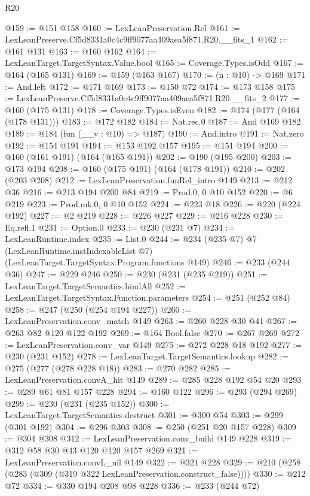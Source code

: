 \begin{lexlean}{R20}
\begin{coremodule}
@159 := @151 @158
@160 := LexLeanPreservation.Rel
@161 := LexLeanPreserve.Cf5d8331a0c4c9ff9077aa409aea5f871.R20.__fits_1
@162 := @161 @131
@163 := @160 @162
@164 := LexLeanTarget.TargetSyntax.Value.bool
@165 := Coverage.Types.isOdd
@167 := @164 (@165 @131)
@169 := @159 (@163 @167)
@170 := (n : @10) -> @169
@171 := And.left
@172 := @171 @169
@173 := @150 @72
@174 := @173 @158
@175 := LexLeanPreserve.Cf5d8331a0c4c9ff9077aa409aea5f871.R20.__fits_2
@177 := @160 (@175 @131)
@178 := Coverage.Types.isEven
@182 := @174 (@177 (@164 (@178 @131)))
@183 := @172 @182
@184 := Nat.rec.{0}
@187 := And @169 @182
@189 := @184 (fun (__v : @10) => @187)
@190 := And.intro
@191 := Nat.zero
@192 := @154 @191
@194 := @153 @192 @157
@195 := @151 @194
@200 := @160 (@161 @191) (@164 (@165 @191))
@202 := @190 (@195 @200)
@203 := @173 @194
@208 := @160 (@175 @191) (@164 (@178 @191))
@210 := @202 (@203 @208)
@212 := LexLeanPreservation.funRel_intro @149
@213 := @212 @36
@216 := @213 @194 @200 @84
@219 := Prod.{0, 0} @10 @152
@220 := @6 @219
@223 := Prod.mk.{0, 0} @10 @152
@224 := @223 @18
@226 := @220 (@224 @192)
@227 := @2 @219
@228 := @226 @227
@229 := @216 @228
@230 := Eq.refl.{1}
@231 := Option.{0}
@233 := @230 (@231 @7)
@234 := LexLeanRuntime.index
@235 := List.{0}
@244 := @234
    (@235 @7)
    @7
    (LexLeanRuntime.instIndexableList @7)
    (LexLeanTarget.TargetSyntax.Program.functions @149)
@246 := @233 (@244 @36)
@247 := @229 @246
@250 := @230 (@231 (@235 @219))
@251 := LexLeanTarget.TargetSemantics.bindAll
@252 := LexLeanTarget.TargetSyntax.Function.parameters
@254 := @251 (@252 @84)
@258 := @247 (@250 (@254 @194 @227))
@260 := LexLeanPreservation.conv_match @149
@263 := @260 @228 @30 @41
@267 := @263 @82 @120 @122 @192
@269 := @164 Bool.false
@270 := @267 @269
@272 := LexLeanPreservation.conv_var @149
@275 := @272 @228 @18 @192
@277 := @230 (@231 @152)
@278 := LexLeanTarget.TargetSemantics.lookup
@282 := @275 (@277 (@278 @228 @18))
@283 := @270 @282
@285 := LexLeanPreservation.convA_hit @149
@289 := @285 @228 @192 @54 @20
@293 := @289 @61 @81 @157 @228
@294 := @160 @122
@296 := @293 (@294 @269)
@299 := @230 (@231 (@235 @152))
@300 := LexLeanTarget.TargetSemantics.destruct
@301 := @300 @54
@303 := @299 (@301 @192)
@304 := @296 @303
@308 := @250 (@251 @20 @157 @228)
@309 := @304 @308
@312 := LexLeanPreservation.conv_build @149 @228
@319 := @312 @58 @30 @43 @120 @120 @157 @269
@321 := LexLeanPreservation.convL_nil @149
@322 := @321 @228
@329 := @210 (@258 (@283 (@309 (@319 @322 LexLeanPreservation.construct_false))))
@330 := @212 @72
@334 := @330 @194 @208 @98 @228
@336 := @233 (@244 @72)

\end{coremodule}
\end{lexlean}

